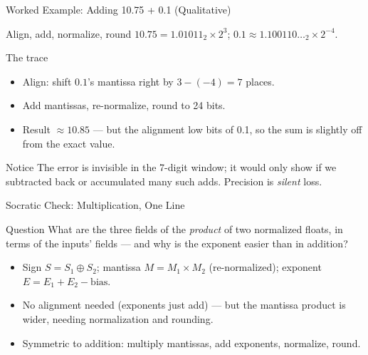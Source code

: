 \documentclass[aspectratio=169]{beamer}
\begin{document}
\begin{frame}{Worked Example: Adding 10.75 + 0.1 (Qualitative)}
  \begin{block}{Align, add, normalize, round}
    $10.75 = 1.01011_2 \times 2^3$; $0.1 \approx 1.100110\ldots_2 \times 2^{-4}$.
  \end{block}
  \begin{exampleblock}{The trace}
    \begin{itemize}
      \item Align: shift $0.1$'s mantissa right by $3-(-4) = 7$ places.
      \item Add mantissas, re-normalize, round to 24 bits.
      \item Result $\approx 10.85$ --- but the alignment  low
        bits of 0.1, so the sum is slightly off from the exact value.
    \end{itemize}
  \end{exampleblock}
  \vspace{0.2cm}
  \begin{alertblock}{Notice}
    The error is invisible in the 7-digit window; it would only show if we
    subtracted back or accumulated many such adds. Precision is \emph{silent}
    loss.
  \end{alertblock}
\end{frame}

\begin{frame}{Socratic Check: Multiplication, One Line}
  \begin{alertblock}{Question}
    What are the three fields of the \emph{product} of two normalized floats,
    in terms of the inputs' fields --- and why is the exponent easier than in
    addition?
  \end{alertblock}
  \begin{itemize}
    \item Sign $S = S_1 \oplus S_2$; mantissa $M = M_1 \times M_2$
      (re-normalized); exponent $E = E_1 + E_2 - \text{bias}$.
    \item No alignment needed (exponents just add) --- but the mantissa
      product is wider, needing normalization and rounding.
    \item Symmetric to addition: multiply mantissas, add exponents, normalize,
      round.
  \end{itemize}
\end{frame}

\end{document}
